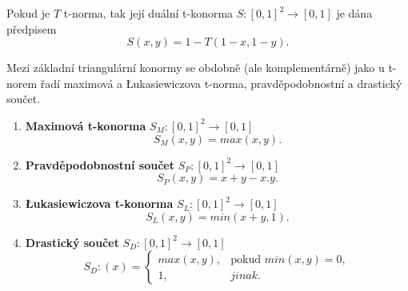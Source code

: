 \begin{sentence}
    \cite{Springer}
    Pokud je $T$ t-norma, tak její duální t-konorma $S: [0,1]^2 \rightarrow [0,1]$ je dána předpisem $$S(x,y) = 1 - T(1-x, 1-y).$$
\end{sentence}


Mezi základní triangulární konormy se obdobně (ale komplementárně) jako u t-norem řadí maximová a Łukasiewiczova t-norma, pravděpodobnostní a drastický součet.
\begin{example}
\cite{Springer}
    \begin{enumerate}
    \item \textbf{Maximová t-konorma} $S_M: [0,1]^2 \rightarrow [0,1]$
    $$S_M(x,y) = max(x,y).$$
    \item \textbf{Pravděpodobnostní součet} $S_P: [0,1]^2 \rightarrow [0,1]$
    $$S_P(x,y) = x+y-x.y.$$
    \item \textbf{Łukasiewiczova t-konorma} $S_L: [0,1]^2 \rightarrow [0,1]$
    $$S_L(x,y) = min(x+y,1).$$
    \item \textbf{Drastický součet} $S_D: [0,1]^2 \rightarrow [0,1]$
    $$S_D:(x)=\begin{cases} max(x,y), & \mbox{pokud  }  min(x,y) = 0,\\ 
    1, &  jinak.  \end{cases}$$
\end{enumerate}
\end{example}

